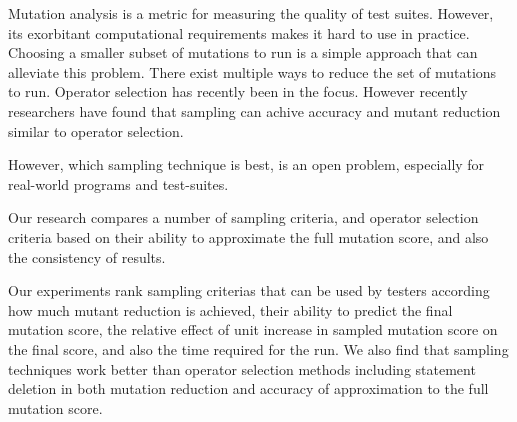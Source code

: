 Mutation analysis is a metric for measuring the quality of test suites. However, its exorbitant computational requirements makes it hard to use in practice. Choosing a smaller subset of mutations to run is a simple approach that can alleviate this problem. There exist multiple ways to reduce the set of mutations to run. Operator selection has recently been in the focus. However recently researchers have found that sampling can achive accuracy and mutant reduction similar to operator selection.

However, which sampling technique is best, is an open problem, especially for real-world programs and test-suites.

Our research compares a number of sampling criteria, and operator selection criteria based on their ability to approximate the full mutation score, and also the consistency of results.

Our experiments rank sampling criterias that can be used by testers according how much mutant reduction is achieved, their ability to predict the final mutation score, the relative effect of unit increase in sampled mutation score on the final score, and also the time required for the run. We also find that sampling techniques work better than operator selection methods including statement deletion in both mutation reduction and accuracy of approximation to the full mutation score.


